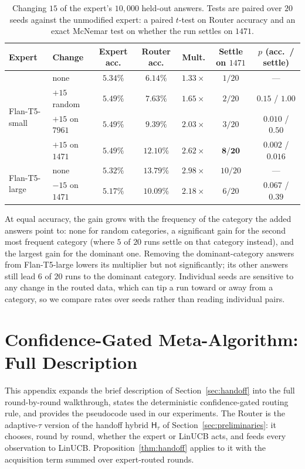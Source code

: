 \documentclass{article}
\theoremstyle{definition}
\theoremstyle{remark}
\theoremstyle{remark}
\newcommand{\Hyb}{\mathsf{H}}
\begin{document}
\begin{table}[h]
\centering
\caption{Changing $15$ of the expert's $10{,}000$ held-out answers. Tests are
paired over $20$ seeds against the unmodified expert: a paired $t$-test on
Router accuracy and an exact McNemar test on whether the run settles on
$1471$.}
\label{tab:inject}
\small
\setlength{\tabcolsep}{4pt}
\begin{tabular}{@{}llccccc@{}}
\toprule
Expert & Change & Expert acc. & Router acc. & Mult. & Settle on $1471$ & $p$ (acc.\ / settle) \\
\midrule
\multirow{4}{*}{Flan-T5-small} & none & $5.34\%$ & $6.14\%$ & $1.33\times$ & $1/20$ & --- \\
& $+15$ random & $5.49\%$ & $7.63\%$ & $1.65\times$ & $2/20$ & $0.15$ / $1.00$ \\
& $+15$ on $7961$ & $5.49\%$ & $9.39\%$ & $2.03\times$ & $3/20$ & $0.010$ / $0.50$ \\
& $+15$ on $1471$ & $5.49\%$ & $\mathbf{12.10\%}$ & $\mathbf{2.62\times}$ & $\mathbf{8/20}$ & $\mathbf{0.002}$ / $\mathbf{0.016}$ \\
\midrule
\multirow{2}{*}{Flan-T5-large} & none & $5.32\%$ & $13.79\%$ & $2.98\times$ & $10/20$ & --- \\
& $-15$ on $1471$ & $5.17\%$ & $10.09\%$ & $2.18\times$ & $6/20$ & $0.067$ / $0.39$ \\
\bottomrule
\end{tabular}
\end{table}

At equal accuracy, the gain grows with the frequency of the category the
added answers point to: none for random categories, a significant gain for
the second most frequent category (where $5$ of $20$ runs settle on that
category instead), and the largest gain for the dominant one. Removing the
dominant-category answers from Flan-T5-large lowers its multiplier but not
significantly; its other answers still lead $6$ of $20$ runs to the
dominant category. Individual seeds are sensitive to any change in the
routed data, which can tip a run toward or away from a category, so we
compare rates over seeds rather than reading individual pairs.

\section{Confidence-Gated Meta-Algorithm: Full Description}
\label{app:meta-algorithm}

This appendix expands the brief description of
Section~\ref{sec:handoff} into the full round-by-round walkthrough,
states the deterministic confidence-gated routing rule, and provides
the pseudocode used in our experiments. The Router is the adaptive-$\tau$ version of the handoff hybrid
$\Hyb_\tau$ of Section~\ref{sec:preliminaries}: it chooses, round by round,
whether the expert or LinUCB acts, and feeds every observation to LinUCB.
Proposition~\ref{thm:handoff} applies to it with the acquisition term summed over
expert-routed rounds.
\end{document}
